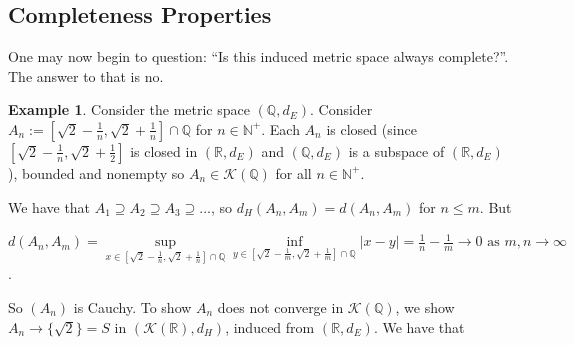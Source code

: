 \documentclass{article}
\theoremstyle{plain}
\theoremstyle{definition}
\newtheorem*{ex}{Example}
\theoremstyle{remark}
\begin{document}
\newpage

\subsection{Completeness Properties}
One may now begin to question: ``Is this induced metric space always complete?''. The answer to that is no.
\begin{ex}
Consider the metric space $(\mathbb{Q}, d_E)$. Consider $A_n:=\left [\sqrt{2} - \frac{1}{n}, \sqrt{2} + \frac{1}{n} \right ] \cap  \mathbb{Q}$ for $n \in \mathbb{N}^+$. Each $A_n$ is closed (since $\left [ \sqrt{2} - \frac{1}{n}, \sqrt{2} + \frac{1}{2}\right ]$ is closed in $(\mathbb{R}, d_E)$ and $(\mathbb{Q}, d_E)$ is a subspace of $(\mathbb{R}, d_E)$), bounded and nonempty so $A_n \in \mathcal{K}(\mathbb{Q})$ for all $n \in \mathbb{N}^+$.
\begin{center}
\end{center}
We have that $A_1 \supseteq A_2 \supseteq A_3 \supseteq ...$, so $d_H(A_n, A_m) = d(A_n, A_m)$ for $n \le m$. But 
\begin{center}
    $d(A_n, A_m) = \sup \limits _{x\in \left [\sqrt{2}-\frac{1}{n}, \sqrt{2}+\frac{1}{n} \right ] \cap \mathbb{Q}} \inf \limits _{y\in \left [\sqrt{2}-\frac{1}{m}, \sqrt{2}+\frac{1}{m} \right ] \cap \mathbb{Q}} |x-y| = \frac{1}{n} - \frac{1}{m} \to 0 \text{ as } m,n\to \infty$.    
\end{center}
 So $(A_n)$ is Cauchy. To show $A_n$ does not converge in $\mathcal{K}(\mathbb{Q})$, we show $A_n \to \{\sqrt{2}\} = S$ in $(\mathcal{K}(\mathbb{R}), d_H)$, induced from $(\mathbb{R}, d_E)$. We have that


\end{ex}
\end{document}
